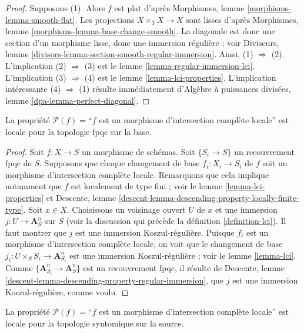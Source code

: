 \begin{proof}
Supposons (1). Alors $f$ est plat d'après
Morphismes, lemme \ref{morphisms-lemma-smooth-flat}.
Les projections $X \times_Y X \to X$ sont lisses d'après
Morphismes, lemme \ref{morphisms-lemma-base-change-smooth}. La diagonale
est donc une section d'un morphisme lisse, donc une immersion régulière ; voir
Diviseurs, lemme \ref{divisors-lemma-section-smooth-regular-immersion}.
Ainsi, (1) $\Rightarrow$ (2).
L'implication (2) $\Rightarrow$ (3) est le
lemme \ref{lemma-regular-immersion-lci}.
L'implication (3) $\Rightarrow$ (4) est le
lemme \ref{lemma-lci-properties}.
L'implication intéressante (4) $\Rightarrow$ (1) résulte immédiatement
d'Algèbre à puissances divisées, lemme \ref{dpa-lemma-perfect-diagonal}.
\end{proof}

\begin{lemma}
\label{lemma-descending-property-lci}
La propriété $\mathcal{P}(f) =$``$f$ est un morphisme d'intersection complète
locale'' est locale pour la topologie fpqc sur la base.
\end{lemma}

\begin{proof}
Soit $f : X \to S$ un morphisme de schémas.
Soit $\{S_i \to S\}$ un recouvrement fpqc de $S$.
Supposons que chaque changement de base $f_i : X_i \to S_i$ de $f$ soit
un morphisme d'intersection complète locale.
Remarquons que cela implique notamment que $f$ est localement de type
fini ; voir
le lemme \ref{lemma-lci-properties}
et
Descente, lemme \ref{descent-lemma-descending-property-locally-finite-type}.
Soit $x \in X$. Choisissons un voisinage ouvert $U$ de $x$ et
une immersion $j : U \to \mathbf{A}^n_S$ sur $S$ (voir la
discussion qui précède la
définition \ref{definition-lci}).
Il faut montrer que $j$ est une immersion Koszul-régulière.
Puisque $f_i$ est un morphisme d'intersection complète locale, on voit
que le changement de base $j_i : U \times_S S_i \to \mathbf{A}^n_{S_i}$
est une immersion Koszul-régulière ; voir
le lemme \ref{lemma-lci}.
Comme $\{\mathbf{A}^n_{S_i} \to \mathbf{A}^n_S\}$ est un
recouvrement fpqc, il résulte de
Descente, lemme \ref{descent-lemma-descending-property-regular-immersion},
que $j$ est une immersion Koszul-régulière, comme voulu.
\end{proof}

\begin{lemma}
\label{lemma-lci-syntomic-local-source}
La propriété $\mathcal{P}(f) =$``$f$ est un morphisme d'intersection complète
locale'' est locale pour la topologie syntomique sur la source.
\end{lemma}

